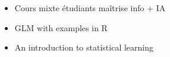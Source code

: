 \documentclass[12pt,french]{article}
\begin{document}
\begin{itemize}
    \item Cours mixte étudiants maîtrise info + IA
    \item GLM with examples in R
    \item An introduction to statistical learning
\end{itemize}
\end{document}
